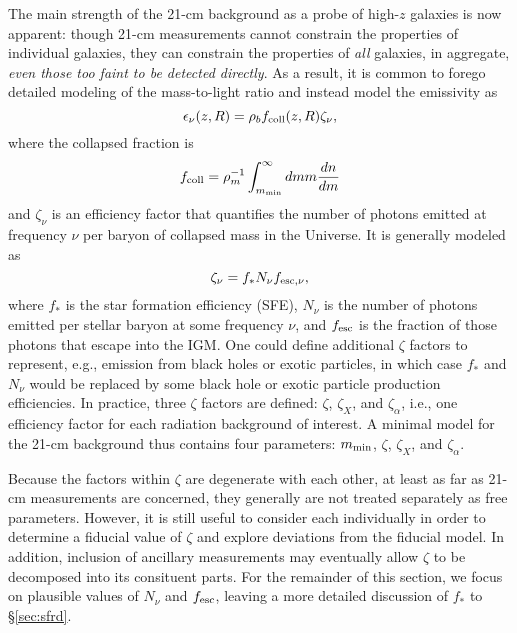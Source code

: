 The main strength of the 21-cm background as a probe of high-$z$ galaxies is now apparent: though 21-cm measurements cannot constrain the properties of individual galaxies, they can constrain the properties of \textit{all} galaxies, in aggregate, \textit{even those too faint to be detected directly}. As a result, it is common to forego detailed modeling of the mass-to-light ratio and instead model the emissivity as
\begin{equation}
	\epsilon_{\nu}(z, R) = \rho_b f_{\text{coll}}(z, R) \zeta_{\nu} ,
\end{equation}
where the collapsed fraction is
\begin{equation}
	f_{\text{coll}} = \rho_m^{-1} \int_{m_{\text{min}}}^{\infty} dm m \frac{dn}{dm}
\end{equation}
and $\zeta_{\nu}$ is an efficiency factor that quantifies the number of photons emitted at frequency $\nu$ per baryon of collapsed mass in the Universe. It is generally modeled as
\begin{equation}
	\zeta_{\nu} = f_{\ast} N_{\nu} f_{\text{esc},\nu} , \label{eq:zeta}
\end{equation}
where $f_{\ast}$ is the star formation efficiency (SFE), $N_{\nu}$ is the number of photons emitted per stellar baryon at some frequency $\nu$, and $f_{\text{esc}}$ is the fraction of those photons that escape into the IGM. One could define additional $\zeta$ factors to represent, e.g., emission from black holes or exotic particles, in which case $f_{\ast}$ and $N_{\nu}$ would be replaced by some black hole or exotic particle production efficiencies. In practice, three $\zeta$ factors are defined: $\zeta$, $\zeta_X$, and $\zeta_{\alpha}$, i.e., one efficiency factor for each radiation background of interest. A minimal model for the 21-cm background thus contains four parameters: $m_{\text{min}}$, $\zeta$, $\zeta_X$, and $\zeta_{\alpha}$. 

Because the factors within $\zeta$ are degenerate with each other, at least as far as 21-cm measurements are concerned, they generally are not treated separately as free parameters. However, it is still useful to consider each individually in order to determine a fiducial value of $\zeta$ and explore deviations from the fiducial model. In addition, inclusion of ancillary measurements may eventually allow $\zeta$ to be decomposed into its consituent parts. For the remainder of this section, we focus on plausible values of $N_{\nu}$ and $f_{\text{esc}}$, leaving a more detailed discussion of $f_{\ast}$ to \S\ref{sec:sfrd}. 


